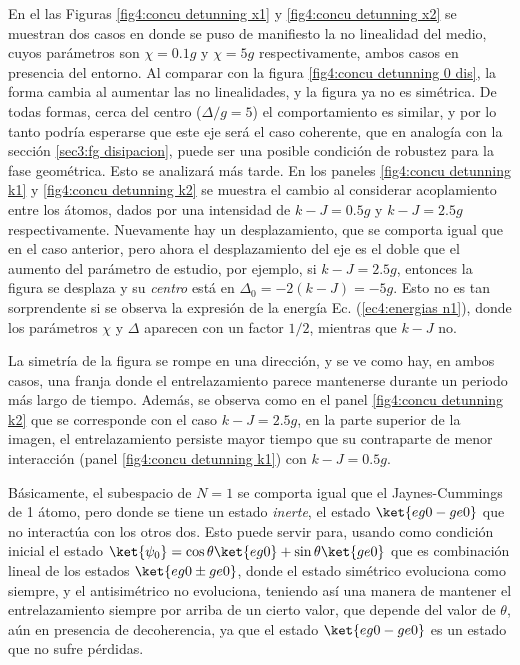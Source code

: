 En el las Figuras \ref{fig4:concu detunning x1} y \ref{fig4:concu detunning x2} se muestran dos casos en donde se puso de manifiesto la no linealidad del medio, cuyos parámetros son $\chi=0.1g$ y $\chi=5g$ respectivamente, ambos casos en presencia del entorno. Al comparar con la figura \ref{fig4:concu detunning 0 dis}, la forma cambia al aumentar las no linealidades, y la figura ya no es simétrica. De todas formas, cerca del centro ($\Delta/g=5$) el comportamiento es similar, y por lo tanto podría esperarse que este eje será el caso coherente, que en analogía con la sección \ref{sec3:fg disipacion}, puede ser una posible condición de robustez para la fase geométrica. Esto se analizará más tarde. En los paneles \ref{fig4:concu detunning k1} y \ref{fig4:concu detunning k2} se muestra el cambio al considerar acoplamiento entre los átomos, dados por una intensidad de $k-J=0.5g$ y $k-J=2.5g$ respectivamente. Nuevamente hay un desplazamiento, que se comporta igual que en el caso anterior, pero ahora el desplazamiento del eje es el doble que el aumento del parámetro de estudio, por ejemplo, si $k-J=2.5g$, entonces la figura se desplaza y su \textit{centro} está en $\Delta_0=-2(k-J)=-5g$. Esto no es tan sorprendente si se observa la expresión de la energía Ec. (\ref{ec4:energias n1}), donde los parámetros $\chi$ y $\Delta$ aparecen con un factor $1/2$, mientras que $k-J$ no. 

La simetría de la figura se rompe en una dirección, y se ve como hay, en ambos casos, una franja donde el entrelazamiento parece mantenerse durante un periodo más largo de tiempo. Además, se observa como en el panel \ref{fig4:concu detunning k2} que se corresponde con el caso $k-J=2.5g$, en la parte superior de la imagen, el entrelazamiento persiste mayor tiempo que su contraparte de menor interacción (panel \ref{fig4:concu detunning k1}) con $k-J=0.5g$.

Básicamente, el subespacio de $N=1$ se comporta igual que el Jaynes-Cummings de 1 átomo, pero donde se tiene un estado \textit{inerte}, el estado $\ket{eg0-ge0}$ que no interactúa con los otros dos. Esto puede servir para, usando como condición inicial el estado $\ket{\psi_0}=\cos\theta\ket{eg0}+\sin\theta\ket{ge0}$ que es combinación lineal de los estados $\ket{eg0\pm ge0}$, donde el estado simétrico evoluciona como siempre, y el antisimétrico no evoluciona, teniendo así una manera de mantener el entrelazamiento siempre por arriba de un cierto valor, que depende del valor de $\theta$, aún en presencia de decoherencia, ya que el estado $\ket{eg0-ge0}$ es un estado que no sufre pérdidas.

